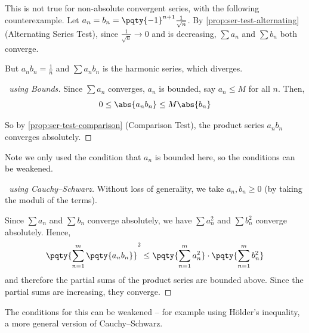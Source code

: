\begin{remark}
    This is not true for non-absolute convergent series, with the following counterexample. Let \(a_n = b_n = \pqty{-1}^{n + 1} \frac{1}{\sqrt{n}}\). By \autoref{prop:ser-test-alternating} (Alternating Series Test), since \(\frac{1}{\sqrt{n}} \to 0\) and is decreasing, \(\sum a_n\) and \(\sum b_n\) both converge.

    But \(a_n b_n = \frac{1}{n}\) and \(\sum a_n b_n\) is the harmonic series, which diverges.
\end{remark}

\begin{proof}[\proofname\ using Bounds]
    Since \(\sum a_n\) converges, \(a_n\) is bounded, say \(a_n \leq M\) for all \(n\). Then,
    \[
            0 \leq \abs{a_n b_n} \leq M \abs{b_n}
    \]

    So by \autoref{prop:ser-test-comparison} (Comparison Test), the product series \(a_n b_n\) converges absolutely.
\end{proof}

\begin{remark}
    Note we only used the condition that \(a_n\) is bounded here, so the conditions can be weakened.
\end{remark}

\begin{proof}[\proofname\ using Cauchy--Schwarz]
    Without loss of generality, we take \(a_n, b_n \geq 0\) (by taking the moduli of the terms).

    Since \(\sum a_n\) and \(\sum b_n\) converge absolutely, we have \(\sum a_n^2\) and \(\sum b_n^2\) converge absolutely. Hence,
    \[
        \pqty{\sum_{n = 1}^{m} \pqty{a_n b_n}}^2 \leq \pqty{\sum_{n = 1}^{m} a_n^2} \cdot \pqty{\sum_{n = 1}^{m} b_n^2}
    \]
    and therefore the partial sums of the product series are bounded above. Since the partial sums are increasing, they converge.
\end{proof}
\begin{remark}
    The conditions for this can be weakened -- for example using H\"older's inequality, a more general version of Cauchy--Schwarz.
\end{remark}